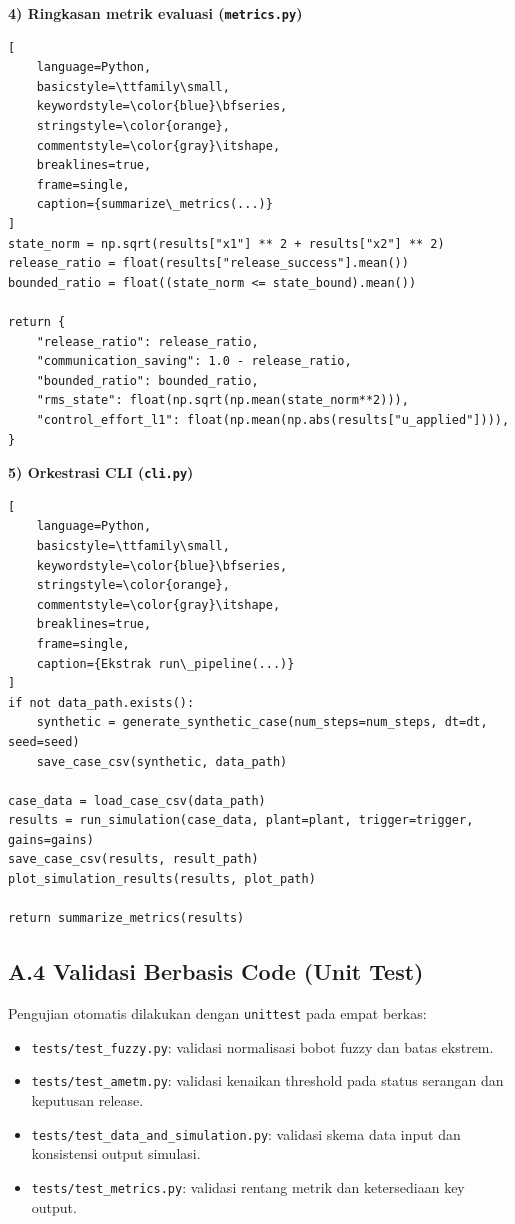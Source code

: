 \textbf{4) Ringkasan metrik evaluasi (\texttt{metrics.py})}

\begin{lstlisting}[
    language=Python,
    basicstyle=\ttfamily\small,
    keywordstyle=\color{blue}\bfseries,
    stringstyle=\color{orange},
    commentstyle=\color{gray}\itshape,
    breaklines=true,
    frame=single,
    caption={summarize\_metrics(...)}
]
state_norm = np.sqrt(results["x1"] ** 2 + results["x2"] ** 2)
release_ratio = float(results["release_success"].mean())
bounded_ratio = float((state_norm <= state_bound).mean())

return {
    "release_ratio": release_ratio,
    "communication_saving": 1.0 - release_ratio,
    "bounded_ratio": bounded_ratio,
    "rms_state": float(np.sqrt(np.mean(state_norm**2))),
    "control_effort_l1": float(np.mean(np.abs(results["u_applied"]))),
}
\end{lstlisting}

\textbf{5) Orkestrasi CLI (\texttt{cli.py})}

\begin{lstlisting}[
    language=Python,
    basicstyle=\ttfamily\small,
    keywordstyle=\color{blue}\bfseries,
    stringstyle=\color{orange},
    commentstyle=\color{gray}\itshape,
    breaklines=true,
    frame=single,
    caption={Ekstrak run\_pipeline(...)}
]
if not data_path.exists():
    synthetic = generate_synthetic_case(num_steps=num_steps, dt=dt, seed=seed)
    save_case_csv(synthetic, data_path)

case_data = load_case_csv(data_path)
results = run_simulation(case_data, plant=plant, trigger=trigger, gains=gains)
save_case_csv(results, result_path)
plot_simulation_results(results, plot_path)

return summarize_metrics(results)
\end{lstlisting}

\subsection*{A.4 Validasi Berbasis Code (Unit Test)}

Pengujian otomatis dilakukan dengan \texttt{unittest} pada empat berkas:
\begin{itemize}[leftmargin=*]
    \item \texttt{tests/test\_fuzzy.py}: validasi normalisasi bobot fuzzy dan batas ekstrem.
    \item \texttt{tests/test\_ametm.py}: validasi kenaikan threshold pada status serangan dan keputusan release.
    \item \texttt{tests/test\_data\_and\_simulation.py}: validasi skema data input dan konsistensi output simulasi.
    \item \texttt{tests/test\_metrics.py}: validasi rentang metrik dan ketersediaan key output.
\end{itemize}

